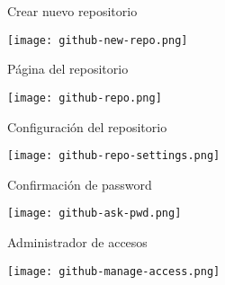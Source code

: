 \begin{frame}[c]{Crear nuevo repositorio}
    \begin{center}
        \texttt{[image: github-new-repo.png]}
    \end{center}
\end{frame}

\begin{frame}[c]{Página del repositorio}
    \begin{center}
        \texttt{[image: github-repo.png]}
    \end{center}
\end{frame}

\begin{frame}[c]{Configuración del repositorio}
    \begin{center}
        \texttt{[image: github-repo-settings.png]}
    \end{center}
\end{frame}

\begin{frame}[c]{Confirmación de password}
    \begin{center}
        \texttt{[image: github-ask-pwd.png]}
    \end{center}
\end{frame}

\begin{frame}[c]{Administrador de accesos}
    \begin{center}
        \texttt{[image: github-manage-access.png]}
    \end{center}
\end{frame}
